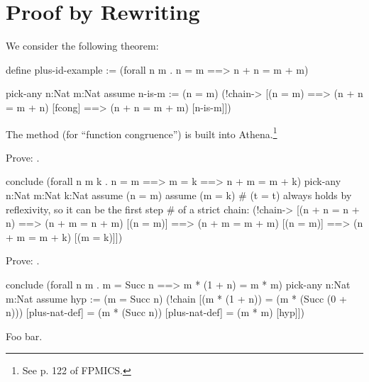 \section{Proof by Rewriting}
We consider the following theorem: 
\begin{tcAthena}
define plus-id-example := (forall n m . n = m ==> n + n = m + m)

pick-any n:Nat m:Nat
  assume n-is-m := (n = m)
     (!chain-> [(n = m) 
            ==> (n + n = m + n)  [fcong]
            ==> (n + n = m + m)  [n-is-m]])
\end{tcAthena}
The method  (for ``function congruence'') is built into Athena.\footnote{See p. 122 of FPMICS.}
\begin{exercise}[subtitle={\mbox{\rm{\em (SF Exercise 8.0.1, p. 21)}}}]
Prove: . 
\end{exercise}
\begin{solution}
\begin{tcAthena}
conclude (forall n m k . n = m ==> m = k ==> n + m = m + k)
  pick-any n:Nat m:Nat k:Nat
    assume (n = m)
      assume (m = k)
       # (t = t) always holds by reflexivity, so it can be the first step 
       # of a strict chain: 
        (!chain-> [(n + n = n + n)  
               ==> (n + m = n + m)  [(n = m)]
               ==> (n + m = m + m)  [(n = m)]
               ==> (n + m = m + k)  [(m = k)]])
\end{tcAthena}
\end{solution}
\begin{exercise}[subtitle={\mbox{\rm{\em (SF Exercise 8.0.2, p. 22)}}}]
Prove: . 
\end{exercise}
\begin{solution}
\begin{tcAthena}
conclude (forall n m . m = Succ n ==> m * (1 + n) = m * m) 
  pick-any n:Nat m:Nat
    assume hyp := (m = Succ n)
      (!chain [(m * (1 + n)) 
             = (m * (Succ (0 + n))) [plus-nat-def]
             = (m * (Succ n))       [plus-nat-def]
             = (m * m)              [hyp]])
\end{tcAthena}
\end{solution}
Foo bar. 

